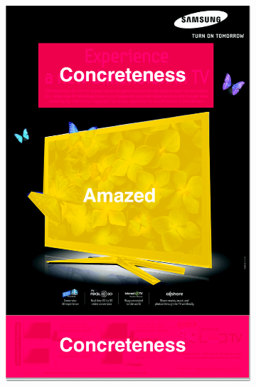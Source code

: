 \documentclass[hidelinks,11pt,a4paper]{report}
\begin{document}
\begin{figure}[!h]
\begin{subfigure}[b]{0.24\textwidth}
         \includegraphics[scale=0.22]{images/Image2_Segment.png}
     \end{subfigure}



\end{figure}
\end{document}
